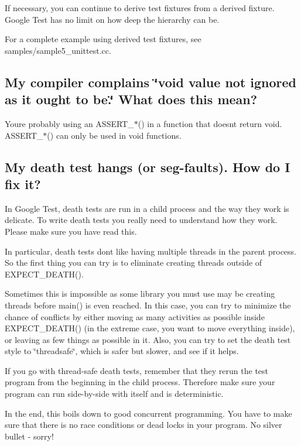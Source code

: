If necessary, you can continue to derive test fixtures from a derived fixture. Google Test has no limit on how deep the hierarchy can be.

For a complete example using derived test fixtures, see {\ttfamily samples/sample5\+\_\+unittest.\+cc}.

\subsection*{My compiler complains \char`\"{}void value not ignored as it ought to be.\char`\"{} What does this mean?}

You\textquotesingle{}re probably using an {\ttfamily A\+S\+S\+E\+R\+T\+\_\+$\ast$()} in a function that doesn\textquotesingle{}t return {\ttfamily void}. {\ttfamily A\+S\+S\+E\+R\+T\+\_\+$\ast$()} can only be used in {\ttfamily void} functions.

\subsection*{My death test hangs (or seg-\/faults). How do I fix it?}

In Google Test, death tests are run in a child process and the way they work is delicate. To write death tests you really need to understand how they work. Please make sure you have read this.

In particular, death tests don\textquotesingle{}t like having multiple threads in the parent process. So the first thing you can try is to eliminate creating threads outside of {\ttfamily E\+X\+P\+E\+C\+T\+\_\+\+D\+E\+A\+T\+H()}.

Sometimes this is impossible as some library you must use may be creating threads before {\ttfamily main()} is even reached. In this case, you can try to minimize the chance of conflicts by either moving as many activities as possible inside {\ttfamily E\+X\+P\+E\+C\+T\+\_\+\+D\+E\+A\+T\+H()} (in the extreme case, you want to move everything inside), or leaving as few things as possible in it. Also, you can try to set the death test style to {\ttfamily \char`\"{}threadsafe\char`\"{}}, which is safer but slower, and see if it helps.

If you go with thread-\/safe death tests, remember that they rerun the test program from the beginning in the child process. Therefore make sure your program can run side-\/by-\/side with itself and is deterministic.

In the end, this boils down to good concurrent programming. You have to make sure that there is no race conditions or dead locks in your program. No silver bullet -\/ sorry!

